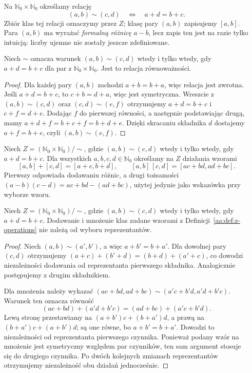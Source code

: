 \begin{definicja}
\label{aa:def:formal-differences}
Na $\mathbb N_0\times\mathbb N_0$ określamy relację
\[
 (a,b)\sim(c,d)\quad\Longleftrightarrow\quad a+d=b+c.
\]
Zbiór klas tej relacji oznaczymy przez $Z$; klasę pary $(a,b)$
zapisujemy $[a,b]$. Para $(a,b)$ ma wyrażać \emph{formalną różnicę}
$a-b$, lecz zapis ten jest na razie tylko intuicją: liczby ujemne
nie zostały jeszcze zdefiniowane.
\end{definicja}

\begin{lemat}
\label{aa:lem:formal-differences-equivalence}
Niech $\sim$ oznacza warunek $(a,b)\sim(c,d)$ wtedy i tylko wtedy,
  gdy $a+d=b+c$ dla par z $\mathbb N_0\times\mathbb N_0$.
  Jest to relacja równoważności.
\end{lemat}
\begin{proof}
Dla każdej pary $(a,b)$ zachodzi $a+b=b+a$, więc relacja
jest zwrotna. Jeśli $a+d=b+c$, to $c+b=d+a$,
więc jest symetryczna. Wreszcie z $(a,b)\sim(c,d)$
oraz $(c,d)\sim(e,f)$ otrzymujemy
$a+d=b+c$ i $c+f=d+e$. Dodając $f$ do pierwszej
równości, a następnie podstawiając drugą, mamy
$a+d+f=b+c+f=b+d+e$. Dzięki skracaniu składnika $d$
dostajemy $a+f=b+e$, czyli $(a,b)\sim(e,f)$.
\end{proof}

\begin{definicja}
\label{aa:def:z-operations}
Niech $Z=(\mathbb N_0\times\mathbb N_0)/\sim$, gdzie
$(a,b)\sim(c,d)$ wtedy i tylko wtedy, gdy $a+d=b+c$.
Dla wszystkich $a,b,c,d\in\mathbb N_0$ określamy na $Z$
działania wzorami
\[
 [a,b]+[c,d]=[a+c,b+d],\qquad
 [a,b]\,[c,d]=[ac+bd,ad+bc].
\]
Pierwszy odpowiada dodawaniu różnic, a drugi tożsamości
$(a-b)(c-d)=ac+bd-(ad+bc)$, użytej jedynie jako
wskazówka przy wyborze wzoru.
\end{definicja}

\begin{lemat}
\label{aa:lem:z-well-defined}
Niech $Z=(\mathbb N_0\times\mathbb N_0)/\sim$, gdzie
$(a,b)\sim(c,d)$ wtedy i tylko wtedy, gdy $a+d=b+c$.
Dodawanie i mnożenie klas zadane wzorami z
Definicji~\ref{aa:def:z-operations} nie zależą od wyboru reprezentantów.
\end{lemat}
\begin{proof}
Niech $(a,b)\sim(a',b')$, a więc $a+b'=b+a'$.
Dla dowolnej pary $(c,d)$ otrzymujemy
$(a+c)+(b'+d)=(b+d)+(a'+c)$, co dowodzi
niezależności dodawania od reprezentanta pierwszego składnika.
Analogicznie postępujemy z drugim składnikiem.

Dla mnożenia należy wykazać
$(ac+bd,ad+bc)\sim(a'c+b'd,a'd+b'c)$.
Warunek ten oznacza równość
\[
 (ac+bd)+(a'd+b'c)=(ad+bc)+(a'c+b'd).
\]
Lewą stronę przestawiamy na $(a+b')c+(b+a')d$,
a prawą na $(b+a')c+(a+b')d$; są one równe, bo
$a+b'=b+a'$. Dowodzi to niezależności od
reprezentanta pierwszego czynnika. Ponieważ podany wzór
na mnożenie jest symetryczny względem par czynników,
ten sam argument stosuje się do drugiego czynnika.
Po dwóch kolejnych zmianach reprezentantów otrzymujemy
niezależność obu działań jednocześnie.
\end{proof}

